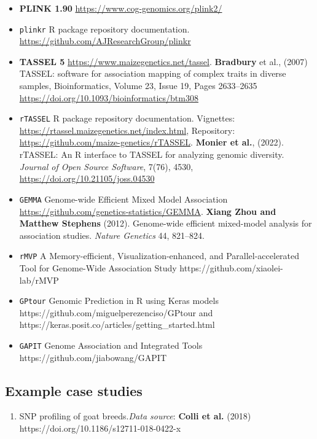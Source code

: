 \begin{itemize}
\item
  \textbf{PLINK 1.90} \url{https://www.cog-genomics.org/plink2/}
\item
  \texttt{plinkr} R package repository documentation.
  \url{https://github.com/AJResearchGroup/plinkr}
\item
  \textbf{TASSEL 5} \url{https://www.maizegenetics.net/tassel}.
  \textbf{Bradbury} et al., (2007) TASSEL: software for association
  mapping of complex traits in diverse samples, Bioinformatics, Volume
  23, Issue 19, Pages 2633--2635
  \url{https://doi.org/10.1093/bioinformatics/btm308}
\item
  \texttt{rTASSEL} R package repository documentation. Vignettes:
  \url{https://rtassel.maizegenetics.net/index.html}, Repository:
  \url{https://github.com/maize-genetics/rTASSEL}. \textbf{Monier et
  al.}, (2022). rTASSEL: An R interface to TASSEL for analyzing genomic
  diversity. \emph{Journal of Open Source Software}, 7(76), 4530,
  \url{https://doi.org/10.21105/joss.04530}
\item
  \texttt{GEMMA} Genome-wide Efficient Mixed Model Association
  \url{https://github.com/genetics-statistics/GEMMA}. \textbf{Xiang Zhou
  and Matthew Stephens} (2012). Genome-wide efficient mixed-model
  analysis for association studies. \emph{Nature Genetics} 44, 821--824.
\item
  \texttt{rMVP} A Memory-efficient, Visualization-enhanced, and
  Parallel-accelerated Tool for Genome-Wide Association Study
  https://github.com/xiaolei-lab/rMVP
\item
  \texttt{GPtour} Genomic Prediction in R using Keras models
  https://github.com/miguelperezenciso/GPtour and
  https://keras.posit.co/articles/getting\_started.html
\item
  \texttt{GAPIT} Genome Association and Integrated Tools
  https://github.com/jiabowang/GAPIT
\end{itemize}

\hypertarget{example-case-studies}{%
\subsection{Example case studies}\label{example-case-studies}}

\begin{enumerate}
\def\labelenumi{\arabic{enumi}.}
\tightlist
\item
  SNP profiling of goat breeds.\emph{Data source}: \textbf{Colli et al.}
  (2018) https://doi.org/10.1186/s12711-018-0422-x
\end{enumerate}

